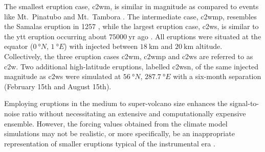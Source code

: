 \documentclass{ametsocV6.1}
\newcommand{\iso}[1][i]{{#1}njected \ce{SO2}}
\begin{document}
The smallest eruption case, \gls{c2wm}, is similar in magnitude as compared to events
like Mt.\ Pinatubo
\citep[\(\sim10\)--\(\SI{20}{\tera\gram(\ce{SO2})}\);][]{timmreck2018} and Mt.\ Tambora
\citep[\(\sim\SI{56.2}{\tera\gram(\ce{SO2})}\);][]{zanchettin2016}. The intermediate
case, \gls{c2wmp}, resembles the Samalas eruption in 1257
\citep[\(\sim{118.8}\)--\(\SI{173.1}{\tera\gram(\ce{SO2})}\);][]{toohey2017,ottobliesner2016},
while the largest eruption case, \gls{c2ws}, is similar to the \gls{ytt} eruption
occurring about \(\SI{75000}{\mathrm{yr}}\) ago
\citep[\(100\)--\(\SI{10000}{\tera\gram(\ce{SO2})}\);][]{jones2005}. All eruptions were
situated at the equator (\(\SI{0}{\degree N}\), \(\SI{1}{\degree E}\)) with 
injected between \(\SI{18}{\kilo\meter}\) and \(\SI{20}{\kilo\meter}\) altitude.
Collectively, the three eruption cases \gls{c2wm}, \gls{c2wmp} and \gls{c2ws} are
referred to as \gls{c2w}. Two additional high-latitude eruptions, labelled \gls{c2wsn},
of the same \iso{} magnitude as \gls{c2ws} were simulated at \(\SI{56}{\degree N}\),
\(\SI{287.7}{\degree E}\) with a six-month separation (February 15th and August 15th).

Employing eruptions in the medium to super-volcano size enhances the signal-to-noise
ratio without necessitating an extensive and computationally expensive ensemble.
However, the forcing values obtained from the climate model simulations may not be
realistic, or more specifically, be an inappropriate representation of smaller eruptions
typical of the instrumental era \citep{gregory2016}.
\end{document}
